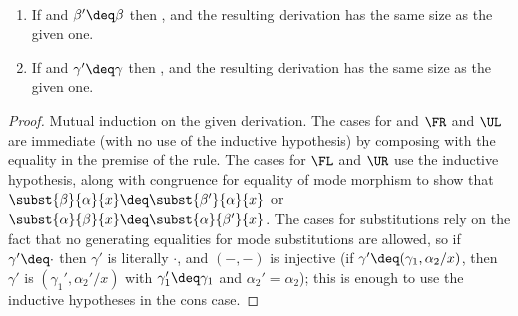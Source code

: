 \begin{lemma} ~ \label{lemma:respecteq}
\begin{enumerate}
\item If  and $\beta' \deq \beta$ then
, and the resulting derivation has the same size
as the given one.
\item If \seq{\Gamma}{\gamma}{\Delta} and $\gamma' \deq \gamma$ then
  , and the resulting derivation has the
  same size as the given one.
\end{enumerate}
\end{lemma}
\begin{proof}
Mutual induction on the given derivation.  The cases for  and
$\FR$ and $\UL$ are immediate (with no use of the inductive
hypothesis) by composing with the equality in the premise of the rule.
The cases for $\FL$ and $\UR$ use the inductive hypothesis,
along with congruence for equality of mode morphism to show that
$\subst{\beta}{\alpha}{x} \deq \subst{\beta'}{\alpha}{x}$ or
$\subst{\alpha}{\beta}{x} \deq \subst{\alpha}{\beta'}{x}$.  The cases
for substitutions rely on the fact that no generating equalities for
mode substitutions are allowed, so if $\gamma' \deq \cdot$ then
$\gamma'$ is literally $\cdot$, and $(-,-)$ is injective (if $\gamma'
\deq (\gamma_1,\alpha_2/x)$, then $\gamma'$ is $(\gamma_1',\alpha_2'/x)$
with $\gamma_1' \deq \gamma_1$ and $\alpha_2' = \alpha_2$); this is
enough to use the inductive hypotheses in the cons case.  
\end{proof}

